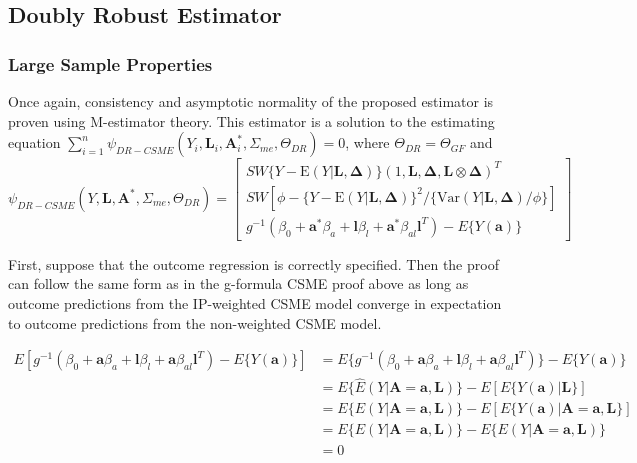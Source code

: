 \documentclass[12pt]{article}
\begin{document}
\subsection{Doubly Robust Estimator}

\subsubsection{Large Sample Properties}

Once again, consistency and asymptotic normality of the proposed estimator is proven using M-estimator theory. This estimator is a solution to the estimating equation $\sum_{i=1}^{n} \psi_{DR-CSME}(Y_{i}, \bm{L}_{i}, \bm{A}_{i}^{*}, \Sigma_{me}, \Theta_{DR}) = 0$, where $\Theta_{DR} = \Theta_{GF}$ and
\begin{equation*}
    \psi_{DR-CSME}(Y, \bm{L}, \bm{A}^{*}, \Sigma_{me}, \Theta_{DR}) =
    \begin{bmatrix}
       SW\{ Y - \text{E}(Y | \bm{L}, \bm{\Delta}) \} (1, \bm{L}, \bm{\Delta}, \bm{L} \otimes \bm{\Delta})^{T} \\
        SW[\phi - \{ Y - \text{E}(Y | \bm{L}, \bm{\Delta}) \}^{2} / \{ \text{Var}(Y | \bm{L}, \bm{\Delta}) / \phi \}] \\
        g^{-1}(\beta_{0} + \bm{a}^{*}\beta_{a} + \bm{l}\beta_{l} +
        \bm{a}^{*}\beta_{al}\bm{l}^{T}) - E \{ Y(\bm{a}) \}
    \end{bmatrix}
\end{equation*}

First, suppose that the outcome regression is correctly specified. Then the proof can follow the same form as in the g-formula CSME proof above as long as outcome predictions from the IP-weighted CSME model converge in expectation to outcome predictions from the non-weighted CSME model.

\begin{align*}
E[g^{-1}(\beta_{0} + \bm{a}\beta_{a} + \bm{l}\beta_{l} +
        \bm{a}\beta_{al}\bm{l}^{T}) - E \{ Y(\bm{a}) \}] &= E \{ g^{-1}(\beta_{0} + \bm{a}\beta_{a} + \bm{l}\beta_{l} +
        \bm{a}\beta_{al}\bm{l}^{T}) \} - E \{ Y(\bm{a}) \} \\
&= E \{ \hat{E}(Y | \bm{A} = \bm{a}, \bm{L}) \} - E[E \{ Y(\bm{a}) | \bm{L} \}] \\
&= E \{ E(Y | \bm{A} = \bm{a}, \bm{L}) \} - E[E \{ Y(\bm{a}) | \bm{A} = \bm{a}, \bm{L} \}] \\
&= E \{ E(Y | \bm{A} = \bm{a}, \bm{L}) \} - E\{ E(Y | \bm{A} = \bm{a}, \bm{L})\} \\
&=0
\end{align*}
\end{document}
